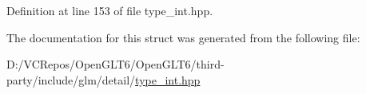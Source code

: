 Definition at line 153 of file type\+\_\+int.\+hpp.



The documentation for this struct was generated from the following file\+:\begin{DoxyCompactItemize}
\item 
D\+:/\+V\+C\+Repos/\+Open\+G\+L\+T6/\+Open\+G\+L\+T6/third-\/party/include/glm/detail/\mbox{\hyperlink{type__int_8hpp}{type\+\_\+int.\+hpp}}\end{DoxyCompactItemize}
